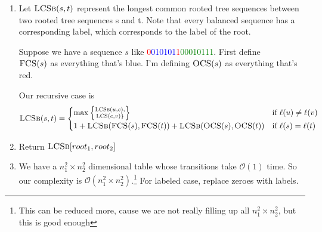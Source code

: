 \documentclass{article}
\begin{document}
        \begin{enumerate}
            \item Let $\textsc{LCSb}(s, t)$ represent the longest common rooted tree sequences between two rooted tree sequences s and t. Note that every balanced sequence has a corresponding label, which corresponds to the label of the root.

            Suppose we have a sequence $s$ like \textcolor{red}{0}\textcolor{blue}{010101}\textcolor{red}{1}\textcolor{green}{00010111}. First define \\
            $\textsc{FCS}(s)$ as everything that's blue. I'm defining $\textsc{OCS}(s)$ as everything that's red.

            Our recursive case is
            $$\textsc{LCSb}(s, t) =
            \begin{cases}
                \max\left\{\substack{\textsc{LCSb}(u, c),\\ \textsc{LCS}(c, v)\}}\right\} & \text{if $\ell(u) \ne \ell(v)$} \\
                1 + \textsc{LCSb}(\textsc{FCS}(s), \textsc{FCS}(t)) + \textsc{LCSb}(\textsc{OCS}(s), \textsc{OCS}(t)) & \text{if $\ell(s) = \ell(t)$}
            \end{cases}$$
            \item Return $\textsc{LCSb}[root_{1}, root_{2}]$
            \item We have a $n_{1}^{2} \times n_{2}^{2}$ dimensional table whose transitions take $\mathcal{O}(1)$ time. So our complexity is $\mathcal{O}(n_{1}^{2} \times n_{2}^{2})$.\footnote{This can be reduced more, cause we are not really filling up all $n_{1}^{2} \times n_{2}^{2}$, but this is good enough}
            For labeled case, replace zeroes with labels.
        \end{enumerate}


        
        
\end{document}
